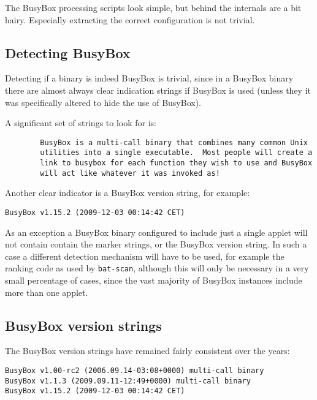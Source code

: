 \documentclass[10pt,a4paper]{article}
\begin{document}
The BusyBox processing scripts look simple, but behind the internals are a bit
hairy. Especially extracting the correct configuration is not trivial.

\subsection{Detecting BusyBox}

Detecting if a binary is indeed BusyBox is trivial, since in a BusyBox binary
there are almost always clear indication strings if BusyBox is used (unless
they it was specifically altered to hide the use of BusyBox).

A significant set of strings to look for is:

\begin{verbatim}
        BusyBox is a multi-call binary that combines many common Unix
        utilities into a single executable.  Most people will create a
        link to busybox for each function they wish to use and BusyBox
        will act like whatever it was invoked as!
\end{verbatim}

Another clear indicator is a BusyBox version string, for example:

\begin{verbatim}
BusyBox v1.15.2 (2009-12-03 00:14:42 CET)
\end{verbatim}

As an exception a BusyBox binary configured to include just a single applet
will not contain contain the marker strings, or the BusyBox version string. In
such a case a different detection mechanism will have to be used, for example
the ranking code as used by \texttt{bat-scan}, although this will only be
necessary in a very small percentage of cases, since the vast majority of
BusyBox instances include more than one applet.

\subsection{BusyBox version strings}

The BusyBox version strings have remained fairly consistent over the years:

\begin{verbatim}
BusyBox v1.00-rc2 (2006.09.14-03:08+0000) multi-call binary
BusyBox v1.1.3 (2009.09.11-12:49+0000) multi-call binary
BusyBox v1.15.2 (2009-12-03 00:14:42 CET)
\end{verbatim}
\end{document}
